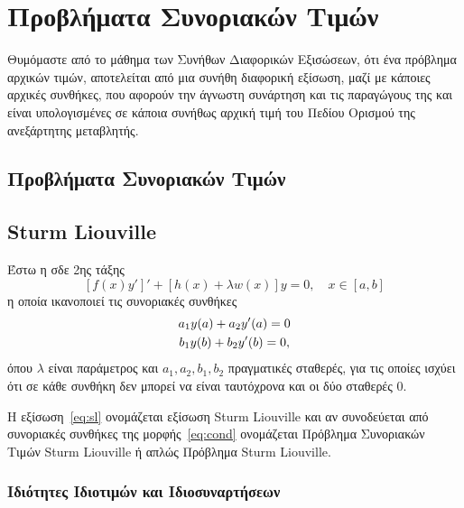 \documentclass[a4paper,table]{report}
\begin{document}
\chapter*{Προβλήματα Συνοριακών Τιμών}

Θυμόμαστε από το μάθημα των Συνήθων Διαφορικών Εξισώσεων, ότι ένα πρόβλημα αρχικών τιμών,
αποτελείται από μια συνήθη διαφορική εξίσωση, μαζί με κάποιες αρχικές συνθήκες,
που αφορούν την άγνωστη συνάρτηση και τις παραγώγους της και είναι υπολογισμένες σε 
κάποια συνήθως αρχική τιμή του Πεδίου Ορισμού της ανεξάρτητης μεταβλητής.

\section*{Προβλήματα Συνοριακών Τιμών}

\section*{Sturm Liouville}

Έστω η σδε 2ης τάξης
\begin{equation}\label{eq:sl}
  [f(x)y']' + [h(x)+ \lambda w(x)]y = 0, \quad x \in [a,b]  
\end{equation}
η οποία ικανοποιεί τις συνοριακές συνθήκες 
\begin{gather}\label{eq:cond}
  a_{1}y(a)+ a_{2}y'(a)=0 \\
  b_{1}y(b)+ b_{2}y'(b)=0 \notag, 
\end{gather} 
όπου $\lambda$ είναι παράμετρος και $ a_{1}, a_{2}, b_{1}, b_{2} $ πραγματικές σταθερές,
για τις οποίες ισχύει ότι σε κάθε συνθήκη δεν μπορεί να είναι ταυτόχρονα και οι δύο
σταθερές 0.

\begin{dfn}
  Η εξίσωση~\eqref{eq:sl} ονομάζεται εξίσωση Sturm Liouville και αν συνοδεύεται από 
  συνοριακές συνθήκες της μορφής~\eqref{eq:cond} ονομάζεται Πρόβλημα Συνοριακών Τιμών 
  Sturm Liouville ή απλώς Πρόβλημα Sturm Liouville.
\end{dfn}



\subsection*{Ιδιότητες Ιδιοτιμών και Ιδιοσυναρτήσεων}
\end{document}
